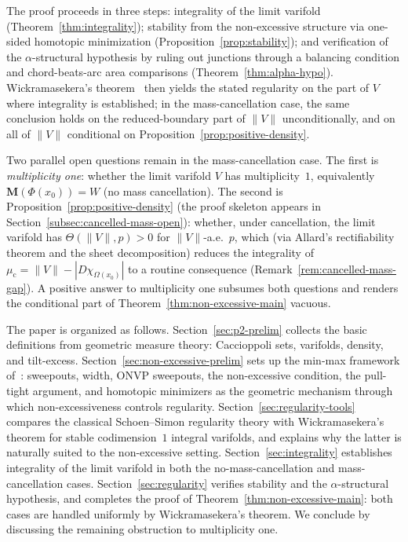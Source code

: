 The proof proceeds in three steps: integrality of the limit varifold (Theorem~\ref{thm:integrality}); stability from the non-excessive structure via one-sided homotopic minimization (Proposition~\ref{prop:stability}); and verification of the $\alpha$-structural hypothesis by ruling out junctions through a balancing condition and chord-beats-arc area comparisons (Theorem~\ref{thm:alpha-hypo}). Wickramasekera's theorem~\cite{Wic14} then yields the stated regularity on the part of $V$ where integrality is established; in the mass-cancellation case, the same conclusion holds on the reduced-boundary part of $\|V\|$ unconditionally, and on all of $\|V\|$ conditional on Proposition~\ref{prop:positive-density}.

Two parallel open questions remain in the mass-cancellation case. The first is \emph{multiplicity one}: whether the limit varifold $V$ has multiplicity~$1$, equivalently $\mathbf{M}(\Phi(x_0)) = W$ (no mass cancellation). The second is Proposition~\ref{prop:positive-density} (the proof skeleton appears in Section~\ref{subsec:cancelled-mass-open}): whether, under cancellation, the limit varifold has $\Theta(\|V\|, p) > 0$ for $\|V\|$-a.e.\ $p$, which (via Allard's rectifiability theorem and the sheet decomposition) reduces the integrality of $\mu_{\mathrm{c}} = \|V\| - |D\chi_{\Omega(x_0)}|$ to a routine consequence (Remark~\ref{rem:cancelled-mass-gap}). A positive answer to multiplicity one subsumes both questions and renders the conditional part of Theorem~\ref{thm:non-excessive-main} vacuous.

The paper is organized as follows. Section~\ref{sec:p2-prelim} collects the basic definitions from geometric measure theory: Caccioppoli sets, varifolds, density, and tilt-excess. Section~\ref{sec:non-excessive-prelim} sets up the min-max framework of~\cite{CLS22}: sweepouts, width, ONVP sweepouts, the non-excessive condition, the pull-tight argument, and homotopic minimizers as the geometric mechanism through which non-excessiveness controls regularity. Section~\ref{sec:regularity-tools} compares the classical Schoen--Simon regularity theory with Wickramasekera's theorem for stable codimension~$1$ integral varifolds, and explains why the latter is naturally suited to the non-excessive setting. Section~\ref{sec:integrality} establishes integrality of the limit varifold in both the no-mass-cancellation and mass-cancellation cases. Section~\ref{sec:regularity} verifies stability and the $\alpha$-structural hypothesis, and completes the proof of Theorem~\ref{thm:non-excessive-main}: both cases are handled uniformly by Wickramasekera's theorem. We conclude by discussing the remaining obstruction to multiplicity one.
